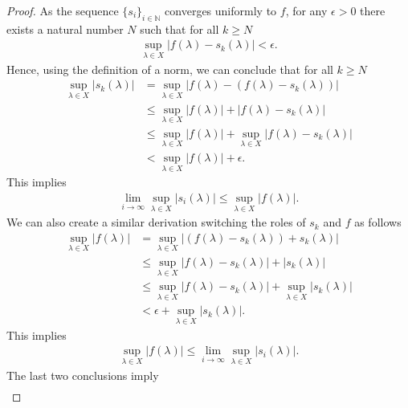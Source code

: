 \begin{proof}
As the sequence $\{s_i\}_{i \in \mathbb{N}}$ converges uniformly to $f$, for any $\epsilon > 0$ there exists a natural number $N$ such that for all $k \ge N$
\begin{align}
    \sup_{\lambda \in X}  \lvert f(\lambda) - s_k(\lambda) \rvert < \epsilon.
\end{align}
Hence, using the definition of a norm, we can conclude that for all $k \ge N$
\begin{align}
    \sup_{\lambda \in X} \lvert s_k(\lambda) \rvert &=   \sup_{\lambda \in X} \lvert f(\lambda) - (f(\lambda) - s_k(\lambda)) \rvert \\
                                          &\le \sup_{\lambda \in X} \lvert f(\lambda) \rvert + \lvert f(\lambda) - s_k(\lambda) \rvert \\
                                          &\le \sup_{\lambda \in X} \lvert f(\lambda) \rvert + \sup_{\lambda \in X} \lvert f(\lambda) - s_k(\lambda) \rvert \\
                                          &< \sup_{\lambda \in X} \lvert f(\lambda) \rvert + \epsilon.
\end{align}
This implies
\begin{align}
    \lim_{i \rightarrow \infty} \sup_{\lambda \in X} \lvert s_i(\lambda) \rvert \le \sup_{\lambda \in X} \lvert f(\lambda) \rvert.
\end{align}
We can also create a similar derivation switching the roles of $s_k$ and $f$ as follows
\begin{align}
    \sup_{\lambda \in X} \lvert f(\lambda) \rvert &= \sup_{\lambda \in X} \lvert (f(\lambda) - s_k(\lambda)) + s_k(\lambda) \rvert \\
                                        &\le \sup_{\lambda \in X} \lvert f(\lambda) - s_k(\lambda) \rvert +  \lvert s_k(\lambda) \rvert \\
                                        &\le \sup_{\lambda \in X} \lvert f(\lambda) - s_k(\lambda) \rvert +  \sup_{\lambda \in X} \lvert s_k(\lambda) \rvert \\
                                        &< \epsilon +  \sup_{\lambda \in X} \lvert s_k(\lambda) \rvert.
\end{align}
This implies
\begin{align}
    \sup_{\lambda \in X} \lvert f(\lambda) \rvert \le \lim_{i \rightarrow \infty} \sup_{\lambda \in X} \lvert s_i(\lambda) \rvert.
\end{align}
The last two conclusions imply
\begin{align}

\end{align}
\end{proof}
